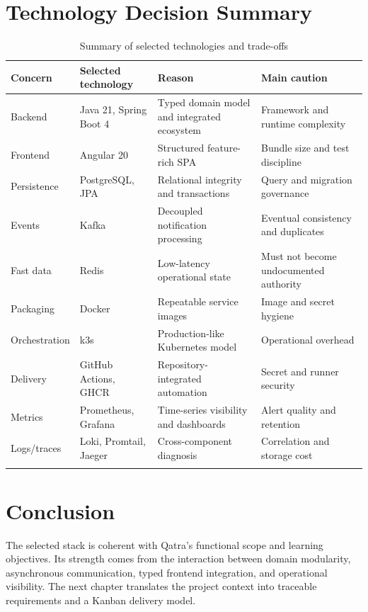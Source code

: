 \section{Technology Decision Summary}
\begin{longtable}{|P{3.0cm}|P{3.5cm}|P{4.0cm}|P{3.2cm}|}
\hline
{}\textbf{Concern} & \textbf{Selected technology} & \textbf{Reason} & \textbf{Main caution}\\ \hline
Backend & Java 21, Spring Boot 4 & Typed domain model and integrated ecosystem & Framework and runtime complexity\\ \hline
Frontend & Angular 20 & Structured feature-rich SPA & Bundle size and test discipline\\ \hline
Persistence & PostgreSQL, JPA & Relational integrity and transactions & Query and migration governance\\ \hline
Events & Kafka & Decoupled notification processing & Eventual consistency and duplicates\\ \hline
Fast data & Redis & Low-latency operational state & Must not become undocumented authority\\ \hline
Packaging & Docker & Repeatable service images & Image and secret hygiene\\ \hline
Orchestration & k3s & Production-like Kubernetes model & Operational overhead\\ \hline
Delivery & GitHub Actions, GHCR & Repository-integrated automation & Secret and runner security\\ \hline
Metrics & Prometheus, Grafana & Time-series visibility and dashboards & Alert quality and retention\\ \hline
Logs/traces & Loki, Promtail, Jaeger & Cross-component diagnosis & Correlation and storage cost\\ \hline
\caption{Summary of selected technologies and trade-offs}
\label{tab:technology-summary}
\end{longtable}

\section*{Conclusion}
The selected stack is coherent with Qatra's functional scope and learning objectives. Its strength comes from the interaction between domain modularity, asynchronous communication, typed frontend integration, and operational visibility. The next chapter translates the project context into traceable requirements and a Kanban delivery model.
